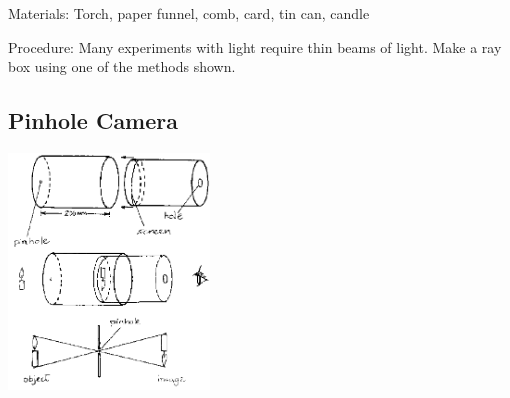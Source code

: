 \begin{multicols}{2}
\begin{description*}
\item[Materials:]{Torch, paper funnel, comb, card, tin can, candle}
\item[Procedure:]{Many experiments with light require thin beams of light. Make a ray box using one of the methods shown.}
\end{description*}

\subsection{Pinhole Camera}

\begin{center}
\includegraphics[width=0.4\textwidth]{./img/source/pinhole-camera.png}
\end{center}


\end{multicols}
